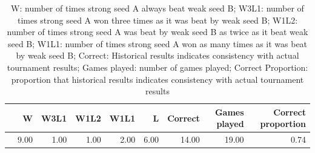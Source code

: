 \documentclass{article} %
\begin{document}
\begin{table}[ht]
\centering
\begin{tabular}{rrrrrrrrr}
\hline
& W & W3L1 & W1L2 & W1L1 & L & Correct & Games played & Correct proportion \\ 
\hline
& 9.00 & 1.00 & 1.00 & 2.00 & 6.00 & 14.00 & 19.00 & 0.74 \\ 
\hline
\end{tabular}

\caption{W: number of times strong seed A always beat weak seed B; W3L1: number of times strong seed A won three times as it was beat by weak seed B; W1L2: number of times strong seed A was beat by weak seed B as twice as it beat weak seed B; W1L1: number of times strong seed A won as many times as it was beat by weak seed B; Correct: Historical results indicates consistency with actual tournament results; Games played: number of games played; Correct Proportion: proportion that historical results indicates consistency with actual tournament results}
\end{table}
\end{document}

